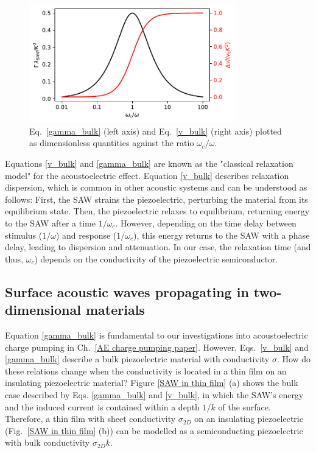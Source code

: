 \documentclass[double,12pt,1in,seploa]{beavtex}
\let\Oldsubsection\subsection
\renewcommand{\subsection}{\FloatBarrier\Oldsubsection}
\begin{document}
\begin{figure}
    \includegraphics[width=0.8\textwidth]{gamma_and_v.pdf}
    \caption{Eq.\ \ref{gamma_bulk} (left axis) and Eq.\ \ref{v_bulk} (right axis) plotted as dimensionless quantities against the ratio $\omega_c/\omega$.}
    \label{gamma_and_v}
\end{figure}
Equations \ref{v_bulk} and \ref{gamma_bulk} are known as the "classical relaxation model" for the acoustoelectric effect. Equation \ref{v_bulk} describes relaxation dispersion, which is common in other acoustic systems \cite{hutson_elastic_1962, rudenko_dispersive_2022} and can be understood as follows: First, the SAW strains the piezoelectric, perturbing the material from its equilibrium state. Then, the piezoelectric relaxes to equilibrium, returning energy to the SAW after a time $1/\omega_c$. However, depending on the time delay between stimulus ($1/\omega$) and response ($1/\omega_c$), this energy returns to the SAW with a phase delay, leading to dispersion and attenuation. In our case, the relaxation time (and thus, $\omega_c$) depends on the conductivity of the piezoelectric semiconductor. 

\subsection{Surface acoustic waves propagating in two-dimensional materials} \label{SAW theory, propagating in 2D materials}

Equation \ref{gamma_bulk} is fundamental to our investigations into acoustoelectric charge pumping in Ch.\ \ref{AE charge pumping paper}. However, Eqs.\ \ref{v_bulk} and \ref{gamma_bulk} describe a bulk piezoelectric material with conductivity $\sigma$. How do these relations change when the conductivity is located in a thin film on an insulating piezoelectric material? Figure \ref{SAW in thin film} (a) shows the bulk case described by Eqs. \ref{gamma_bulk} and \ref{v_bulk}, in which the SAW's energy and the induced current is contained within a depth $1/k$ of the surface. Therefore, a thin film with sheet conductivity $\sigma_{2D}$ on an insulating piezoelectric (Fig.\ \ref{SAW in thin film} (b)) can be modelled as a semiconducting piezoelectric with bulk conductivity $\sigma_{2D}k$.
\end{document}

